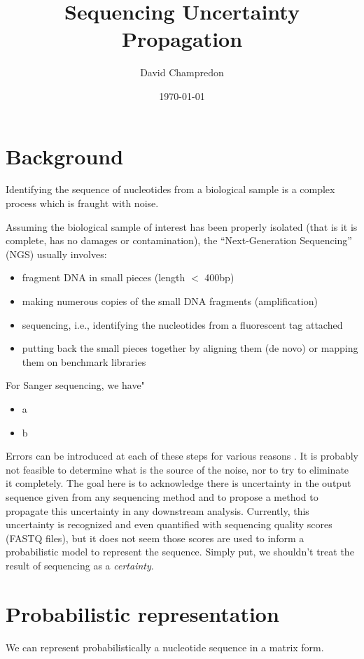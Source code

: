 \documentclass[12pt]{article}
\title{Sequencing Uncertainty Propagation}
\author{David Champredon}
\date{\today}                                           %
\begin{document}
\maketitle

\section{Background}

Identifying the sequence of nucleotides from a biological sample is a complex process which is fraught with noise. 

Assuming the biological sample of interest has been properly isolated (that is it is complete, has no damages or contamination), the ``Next-Generation Sequencing'' (NGS) usually involves:
\begin{itemize}
\item fragment DNA in small pieces (length $<$ 400bp)
\item making numerous copies of the small DNA fragments (amplification)
\item sequencing, i.e., identifying the nucleotides from a fluorescent tag attached
\item putting back the small pieces together by aligning them (de novo) or mapping them on benchmark libraries
\end{itemize}

For Sanger sequencing, we have"
\begin{itemize}
\item a
\item b
\end{itemize}


Errors can be introduced at each of these steps for various reasons \cite{Beerenwinkel:2011}. It is probably not feasible to determine what is the source of the noise, nor to try to eliminate it completely.
The goal here is to acknowledge there is uncertainty in the output sequence given from any sequencing method and to propose a method to propagate this uncertainty in any downstream analysis.
Currently, this uncertainty is recognized and even quantified with sequencing quality scores (FASTQ files), but it does not seem those scores are used to inform a probabilistic model to represent the sequence. 
Simply put, we shouldn't treat the result of sequencing as a \emph{certainty}.

\section{Probabilistic representation}
 
We can represent probabilistically a nucleotide sequence in a matrix form. 


 

\end{document}
